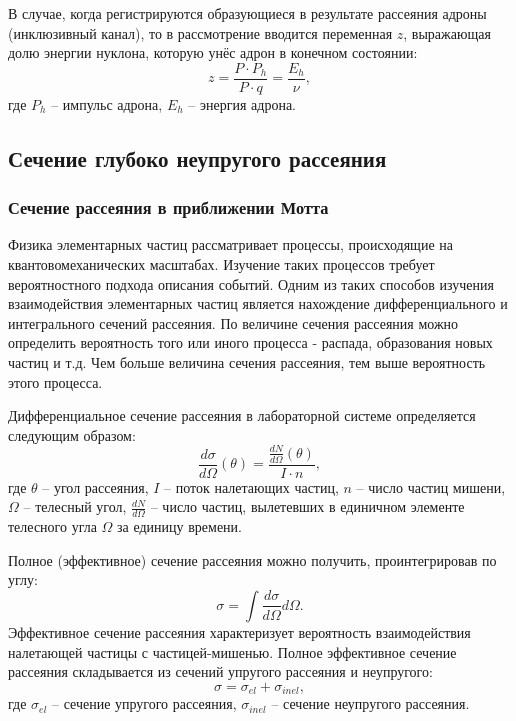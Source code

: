 \documentclass{extarticle}
\begin{document}
В случае, когда регистрируются образующиеся в результате рассеяния адроны (инклюзивный канал), то в рассмотрение вводится переменная $z$, выражающая долю энергии нуклона, которую унёс адрон в конечном состоянии:
\begin{equation}
	\label{eq:z}
	z = \frac{P \cdot P_h}{P \cdot q} = \frac{E_h}{\nu},
\end{equation}
где $P_h$ -- импульс адрона, $E_h$ -- энергия адрона. 
\subsection{Сечение глубоко неупругого рассеяния}
\subsubsection{Сечение рассеяния в приближении Мотта}
Физика элементарных частиц рассматривает процессы, происходящие на квантовомеханических масштабах. Изучение таких процессов требует вероятностного подхода описания событий. Одним из таких способов изучения взаимодействия элементарных частиц является нахождение дифференциального и интегрального сечений рассеяния. По величине сечения рассеяния можно определить вероятность того или иного процесса - распада, образования новых частиц и т.д. Чем больше величина сечения рассеяния, тем выше вероятность этого процесса.

Дифференциальное сечение рассеяния в лабораторной системе определяется следующим образом:
\begin{equation}
    \frac{d\sigma}{d\Omega}(\theta) = \frac{\frac{dN}{d\Omega}(\theta)}{I \cdot n},
\end{equation}
где $\theta$ -- угол рассеяния, $I$ -- поток налетающих частиц, $n$ -- число частиц мишени, $\Omega$ -- телесный угол, $\frac{dN}{d\Omega}$ -- число частиц, вылетевших в единичном элементе телесного угла $\Omega$ за единицу времени.

Полное (эффективное) сечение рассеяния можно получить, проинтегрировав по углу:
\begin{equation}
    \sigma = \int \frac{d\sigma}{d\Omega}d\Omega. 
\end{equation}
Эффективное сечение рассеяния характеризует вероятность взаимодействия налетающей частицы с частицей-мишенью. Полное эффективное сечение рассеяния складывается из сечений упругого рассеяния и неупругого:
\begin{equation}
    \sigma = \sigma_{el} + \sigma_{inel},
\end{equation}
где $\sigma_{el}$ -- сечение упругого рассеяния, $\sigma_{inel}$ -- сечение неупругого рассеяния. 
\end{document}
